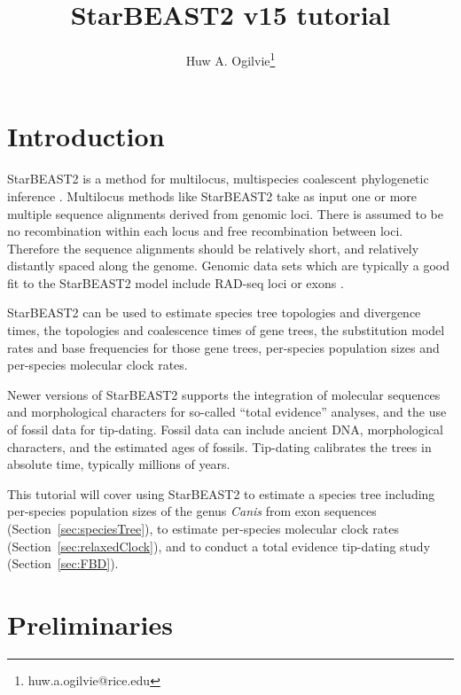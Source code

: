 \documentclass[12pt]{article}
\begin{document}
\title{StarBEAST2 v15 tutorial}
\author[1]{Huw A. Ogilvie\thanks{huw.a.ogilvie@rice.edu}}

\maketitle

\clearpage

\section{Introduction}
\label{sec:intro}

StarBEAST2 is a method for multilocus, multispecies coalescent phylogenetic
inference \parencite{Ogilvie2017}. Multilocus methods like StarBEAST2 take as
input one or more multiple sequence alignments derived from genomic loci.
There is assumed to be no recombination within each locus and free
recombination between loci. Therefore the sequence alignments should be
relatively short, and relatively distantly spaced along the genome. Genomic
data sets which are typically a good fit to the StarBEAST2 model include
RAD-seq loci \parencite{Ogilvie2016} or exons \parencite{Scornavacca2017}.

StarBEAST2 can be used to estimate species tree topologies and divergence
times, the topologies and coalescence times of gene trees, the substitution
model rates and base frequencies for those gene trees, per-species population
sizes and per-species molecular clock rates.

Newer versions of StarBEAST2 supports the integration of molecular sequences
and morphological characters for so-called ``total evidence'' analyses, and
the use of fossil data for tip-dating. Fossil data can include ancient DNA,
morphological characters, and the estimated ages of fossils. Tip-dating
calibrates the trees in absolute time, typically millions of years.

This tutorial will cover using StarBEAST2 to estimate a species tree including
per-species population sizes of the genus \textit{Canis} from exon sequences
(Section~\ref{sec:speciesTree}),
to estimate per-species molecular clock rates
(Section~\ref{sec:relaxedClock}),
and to conduct a total evidence tip-dating study
(Section~\ref{sec:FBD}).

\section{Preliminaries}
\label{sec:prelim}
\end{document}
